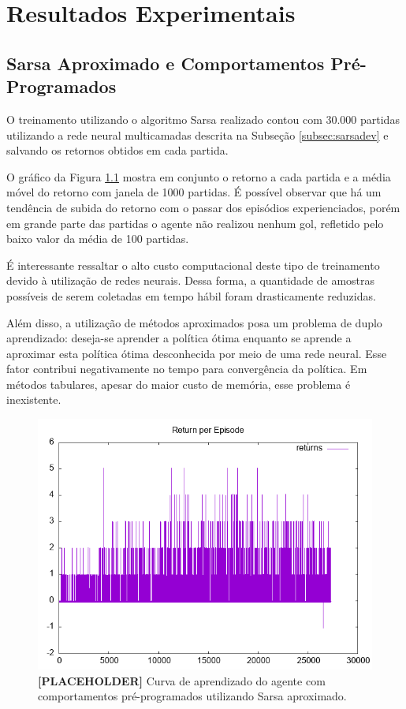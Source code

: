 \chapter{Resultados Experimentais}
\label{chap:Resultados}





\section{Sarsa Aproximado e Comportamentos Pré-Programados}

O treinamento utilizando o algoritmo Sarsa realizado contou com 30.000 partidas utilizando a rede neural multicamadas descrita na Subseção \ref{subsec:sarsadev} e salvando os retornos obtidos em cada partida.

O gráfico da Figura \ref{fig:single-agent-sarsa-behaviors} mostra em conjunto o retorno a cada partida e a média móvel do retorno com janela de 1000 partidas. É possível observar que há um tendência de subida do retorno com o passar dos episódios experienciados, porém em grande parte das partidas o agente não realizou nenhum gol, refletido pelo baixo valor da média de 100 partidas.

É interessante ressaltar o alto custo computacional deste tipo de treinamento devido à utilização de redes neurais. Dessa forma, a quantidade de amostras possíveis de serem coletadas em tempo hábil foram drasticamente reduzidas.

Além disso, a utilização de métodos aproximados posa um problema de duplo aprendizado: deseja-se aprender a política ótima enquanto se aprende a aproximar esta política ótima desconhecida por meio de uma rede neural. Esse fator contribui negativamente no tempo para convergência da política. Em métodos tabulares, apesar do maior custo de memória, esse problema é inexistente.

\begin{figure}[H]
	\includegraphics[width=0.9\linewidth]{figs/sarsa-tmp.png}
	\centering
	\caption{\textbf{[PLACEHOLDER]} Curva de aprendizado do agente com comportamentos pré-programados utilizando Sarsa aproximado.}
	\label{fig:single-agent-sarsa-behaviors}
\end{figure}

